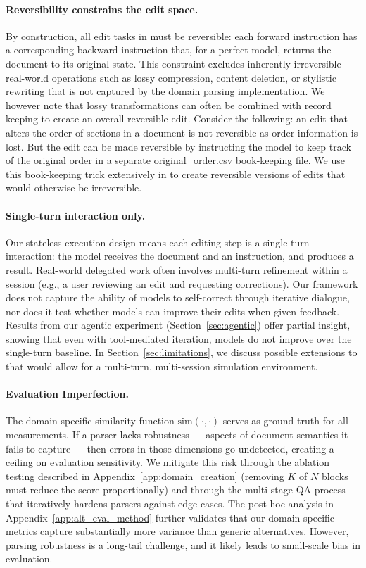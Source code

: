 \documentclass{article} %
\begin{document}
\paragraph{Reversibility constrains the edit space.} By construction, all edit tasks in \benchmark{} must be reversible: each forward instruction has a corresponding backward instruction that, for a perfect model, returns the document to its original state. This constraint excludes inherently irreversible real-world operations such as lossy compression, content deletion, or stylistic rewriting that is not captured by the domain parsing implementation. We however note that lossy transformations can often be combined with record keeping to create an overall reversible edit. Consider the following: an edit that alters the order of sections in a document is not reversible as order information is lost. But the edit can be made reversible by instructing the model to keep track of the original order in a separate original\_order.csv book-keeping file. We use this book-keeping trick extensively in \benchmark{} to create reversible versions of edits that would otherwise be irreversible.

\paragraph{Single-turn interaction only.} Our stateless execution design means each editing step is a single-turn interaction: the model receives the document and an instruction, and produces a result. Real-world delegated work often involves multi-turn refinement within a session (e.g., a user reviewing an edit and requesting corrections). Our framework does not capture the ability of models to self-correct through iterative dialogue, nor does it test whether models can improve their edits when given feedback. Results from our agentic experiment (Section~\ref{sec:agentic}) offer partial insight, showing that even with tool-mediated iteration, models do not improve over the single-turn baseline. In Section~\ref{sec:limitations}, we discuss possible extensions to \benchmark{} that would allow for a multi-turn, multi-session simulation environment.

\paragraph{Evaluation Imperfection.} The domain-specific similarity function $\mathrm{sim}(\cdot, \cdot)$ serves as ground truth for all measurements. If a parser lacks robustness --- aspects of document semantics it fails to capture --- then errors in those dimensions go undetected, creating a ceiling on evaluation sensitivity. We mitigate this risk through the ablation testing described in Appendix~\ref{app:domain_creation} (removing $K$ of $N$ blocks must reduce the score proportionally) and through the multi-stage QA process that iteratively hardens parsers against edge cases. The post-hoc analysis in Appendix~\ref{app:alt_eval_method} further validates that our domain-specific metrics capture substantially more variance than generic alternatives. However, parsing robustness is a long-tail challenge, and it likely leads to small-scale bias in evaluation.
\end{document}
